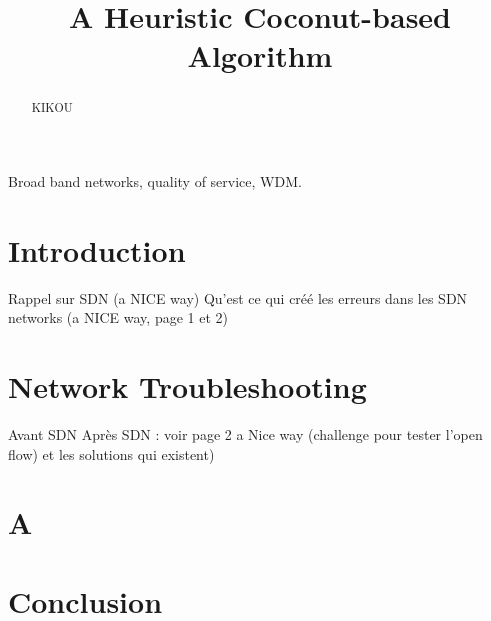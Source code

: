 \documentclass[10pt,draftcls]{IEEEtran}
\begin{document}
\title{A Heuristic Coconut-based Algorithm}


\maketitle
\begin{abstract}
KIKOU
\end{abstract}

\begin{IEEEkeywords}
Broad band networks, quality of service, WDM.
\end{IEEEkeywords}

\section{Introduction}
Rappel sur SDN (a NICE way)
Qu'est ce qui créé les erreurs dans les SDN networks (a NICE way, page 1 et 2)

\section{Network Troubleshooting}
Avant SDN
Après SDN : voir page 2 a Nice way (challenge pour tester l'open flow) et les solutions qui existent)

\section{A}

\section{Conclusion}


\nocite{*}


\end{document}
